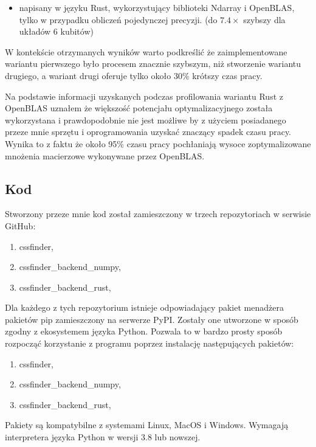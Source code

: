 \documentclass[11pt, a4paper]{article}
\begin{document}
\begin{sloppypar}
\begin{itemize}
      \item napisany w języku Rust, wykorzystujący biblioteki Ndarray i OpenBLAS, tylko w
        przypadku obliczeń pojedynczej precyzji. (do $7.4\times$ szybszy dla układów 6 kubitów)
    \end{itemize}
    W kontekście otrzymanych wyników warto podkreślić że zaimplementowane wariantu pierwszego
    było procesem znacznie szybszym, niż stworzenie wariantu drugiego, a wariant drugi oferuje
    tylko około 30\% krótszy czas pracy.

    Na podstawie informacji uzyskanych podczas profilowania wariantu Rust z OpenBLAS
    uznałem że większość potencjału optymalizacyjnego została wykorzystana i
    prawdopodobnie nie jest możliwe by z użyciem posiadanego przeze mnie sprzętu i
    oprogramowania uzyskać znaczący spadek czasu pracy. Wynika to z faktu że około 95\%
    czasu pracy pochłaniają wysoce zoptymalizowane mnożenia macierzowe wykonywane przez
    OpenBLAS.

    \subsection{Kod}
    Stworzony przeze mnie kod został zamieszczony w trzech repozytoriach w serwisie
    GitHub:
    \begin{enumerate}
      \item cssfinder\cite{CSSFinder_New},

      \item cssfinder\_backend\_numpy\cite{CSSFinder_New_Numpy},

      \item cssfinder\_backend\_rust\cite{CSSFinder_New_Rust},
    \end{enumerate}

    Dla każdego z tych repozytorium istnieje odpowiadający pakiet menadżera pakietów pip
    zamieszczony na serwerze PyPI. Zostały one utworzone w sposób zgodny z ekosystemem języka
    Python. Pozwala to w bardzo prosty sposób rozpocząć korzystanie z programu poprzez
    instalację następujących pakietów:
    \begin{enumerate}
      \item cssfinder\cite{CSSFinder_New_PyPI},

      \item cssfinder\_backend\_numpy\cite{CSSFinder_New_Numpy_PyPI},

      \item cssfinder\_backend\_rust\cite{CSSFinder_New_Rust_PyPI},
    \end{enumerate}

    Pakiety są kompatybilne z systemami Linux, MacOS i Windows. Wymagają interpretera
    języka Python w wersji 3.8 lub nowszej.
  \end{sloppypar}
  \newpage
  \begin{sloppypar}
    \medskip


    \printbibliography
    [heading=bibintoc, title={Odwołania}]
  \end{sloppypar}
\end{document}
